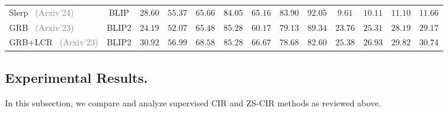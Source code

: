 \begin{table*}
\begin{tabular}{l|c|cccc|ccc|cccc}
    Slerp~\cite{slerp} \footnotesize{\textcolor{gray}{(Arxiv'24)}} & BLIP & $28.60$ & $55.37$ & $65.66$ & $84.05$ & $65.16$ & $83.90$ & $92.05$ & $9.61$ & $10.11$ & $11.10$ & $11.66$\\
    GRB~\cite{grb} \footnotesize{\textcolor{gray}{(Arxiv'23)}} & BLIP2 & $24.19$ & $52.07$ & $65.48$ & $85.28$ & $60.17$ & $79.13$ & $89.34$ & $23.76$ & $25.31$ & $28.19$ & $29.17$\\
    GRB+LCR~\cite{grb} \footnotesize{\textcolor{gray}{(Arxiv'23)}} & BLIP2 & $30.92$ & $56.99$ & $68.58$ & $85.28$ & $66.67$ & $78.68$ & $82.60$ & $25.38$ & $26.93$ & $29.82$ & $30.74$\\
   
    \hline
    \end{tabular}
    \label{tab:zs_CIR_exp_cirr_circo_ori}
\end{table*}

\subsection{Experimental Results.}
In this subsection, we compare and analyze supervised CIR and ZS-CIR methods as reviewed above.



